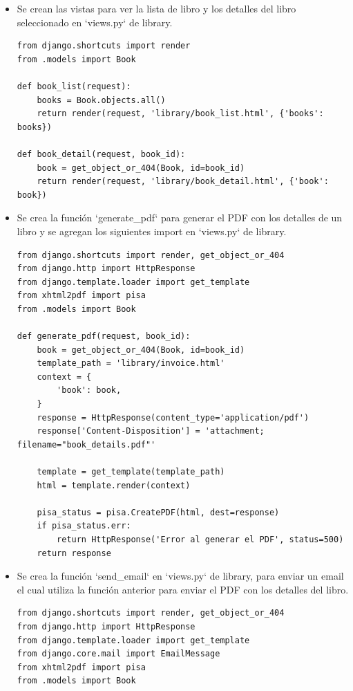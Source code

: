 \documentclass{article}
\begin{document}
\begin{itemize}

\item Se crean las vistas para ver la lista de libro y los detalles del libro seleccionado en `views.py` de library.

\begin{lstlisting}[style=python]
from django.shortcuts import render
from .models import Book

def book_list(request):
    books = Book.objects.all()
    return render(request, 'library/book_list.html', {'books': books})

def book_detail(request, book_id):
    book = get_object_or_404(Book, id=book_id)
    return render(request, 'library/book_detail.html', {'book': book})
\end{lstlisting}

\item Se crea la función `generate\_pdf` para generar el PDF con los detalles de un libro y se agregan los siguientes import en `views.py` de library.

\begin{lstlisting}[style=python]
from django.shortcuts import render, get_object_or_404
from django.http import HttpResponse
from django.template.loader import get_template
from xhtml2pdf import pisa
from .models import Book

def generate_pdf(request, book_id):
    book = get_object_or_404(Book, id=book_id)
    template_path = 'library/invoice.html'
    context = {
        'book': book,
    }
    response = HttpResponse(content_type='application/pdf')
    response['Content-Disposition'] = 'attachment; filename="book_details.pdf"'

    template = get_template(template_path)
    html = template.render(context)

    pisa_status = pisa.CreatePDF(html, dest=response)
    if pisa_status.err:
        return HttpResponse('Error al generar el PDF', status=500)
    return response
\end{lstlisting}

\item Se crea la función `send\_email` en `views.py` de library, para enviar un email el cual utiliza la función anterior para enviar el PDF con los detalles del libro.

\begin{lstlisting}[style=python]
from django.shortcuts import render, get_object_or_404
from django.http import HttpResponse
from django.template.loader import get_template
from django.core.mail import EmailMessage
from xhtml2pdf import pisa
from .models import Book


\end{lstlisting}
\end{itemize}
\end{document}
